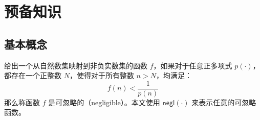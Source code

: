 \chapter{预备知识}


\section{基本概念}

\begin{definition}[可忽略函数]\label{def:negligible}
给出一个从自然数集映射到非负实数集的函数 $f$，如果对于任意正多项式 $p(\cdot)$，都存在一个正整数 $N$，使得对于所有整数 $n > N$，均满足：
\begin{equation*}
    f(n) < \frac{1}{p(n)}
\end{equation*}
那么称函数 $f$ 是可忽略的（negligible）。本文使用 $\mathsf{negl}(\cdot)$ 来表示任意的可忽略函数。
\end{definition}

